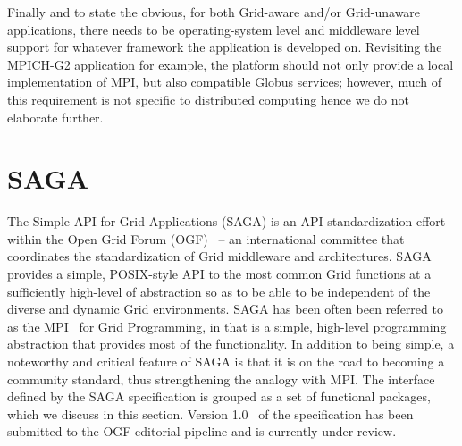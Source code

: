 \documentclass[conference,final]{IEEEtran}
\begin{document}
Finally and to state the obvious, for both Grid-aware and/or
Grid-unaware applications, there needs to be operating-system level
and middleware level support for whatever framework the application is
developed on. Revisiting the MPICH-G2 application for example, the
platform should not only provide a local implementation of MPI, but
also compatible Globus services; however, much of this requirement is
not specific to distributed computing hence we do not elaborate
further.







\section{SAGA}\label{sec:saga}

The Simple API for Grid Applications (SAGA) is an API standardization
effort within the Open Grid Forum (OGF)~\cite{ogf_web} -- an
international committee that coordinates the standardization of Grid
middleware and architectures. SAGA provides a simple, POSIX-style API
to the most common Grid functions at a sufficiently high-level of
abstraction so as to be able to be independent of the diverse and
dynamic Grid environments.  SAGA has been often been referred to as
the MPI~\cite{mpiforum_url} for Grid Programming, in that is a simple,
high-level programming abstraction that provides most of the
functionality. In addition to being simple, a noteworthy and critical
feature of SAGA is that it is on the road to becoming a community
standard, thus strengthening the analogy with MPI.  The interface
defined by the SAGA specification is grouped as a set of functional
packages, which we discuss in this section. Version
1.0~\cite{saga-core} of the specification has been submitted to the
OGF editorial pipeline and is currently under review.
\end{document}
